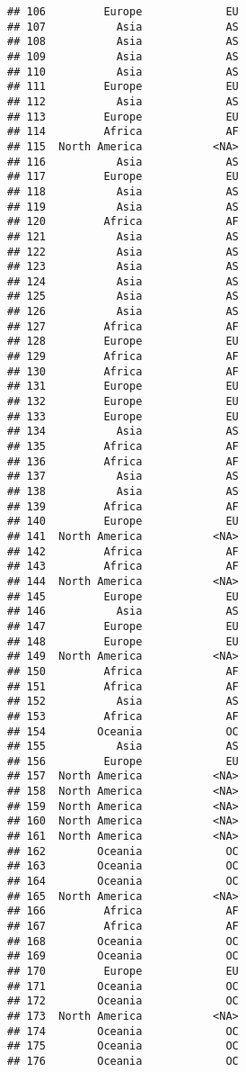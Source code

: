 \documentclass[
]{article}
\begin{document}
\begin{verbatim}
## 106         Europe             EU
## 107           Asia             AS
## 108           Asia             AS
## 109           Asia             AS
## 110           Asia             AS
## 111         Europe             EU
## 112           Asia             AS
## 113         Europe             EU
## 114         Africa             AF
## 115  North America           <NA>
## 116           Asia             AS
## 117         Europe             EU
## 118           Asia             AS
## 119           Asia             AS
## 120         Africa             AF
## 121           Asia             AS
## 122           Asia             AS
## 123           Asia             AS
## 124           Asia             AS
## 125           Asia             AS
## 126           Asia             AS
## 127         Africa             AF
## 128         Europe             EU
## 129         Africa             AF
## 130         Africa             AF
## 131         Europe             EU
## 132         Europe             EU
## 133         Europe             EU
## 134           Asia             AS
## 135         Africa             AF
## 136         Africa             AF
## 137           Asia             AS
## 138           Asia             AS
## 139         Africa             AF
## 140         Europe             EU
## 141  North America           <NA>
## 142         Africa             AF
## 143         Africa             AF
## 144  North America           <NA>
## 145         Europe             EU
## 146           Asia             AS
## 147         Europe             EU
## 148         Europe             EU
## 149  North America           <NA>
## 150         Africa             AF
## 151         Africa             AF
## 152           Asia             AS
## 153         Africa             AF
## 154        Oceania             OC
## 155           Asia             AS
## 156         Europe             EU
## 157  North America           <NA>
## 158  North America           <NA>
## 159  North America           <NA>
## 160  North America           <NA>
## 161  North America           <NA>
## 162        Oceania             OC
## 163        Oceania             OC
## 164        Oceania             OC
## 165  North America           <NA>
## 166         Africa             AF
## 167         Africa             AF
## 168        Oceania             OC
## 169        Oceania             OC
## 170         Europe             EU
## 171        Oceania             OC
## 172        Oceania             OC
## 173  North America           <NA>
## 174        Oceania             OC
## 175        Oceania             OC
## 176        Oceania             OC

\end{verbatim}
\end{document}
